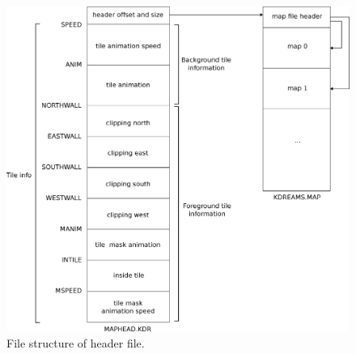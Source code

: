 \documentclass[book.tex]{subfiles}
\begin{document}
 
\begin{figure}[H]
\centering
 \includegraphics[width=1.0\textwidth]{imgs/drawings/map_header.eps}
 \caption{File structure of  header file.}
 \label{fig:map-header-file}
\end{figure}
\par
\end{document}
